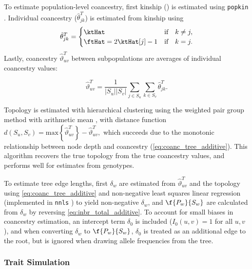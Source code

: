 \documentclass[11pt]{article}
\begin{document}
\begin{linenumbers}
To estimate population-level coancestry, first kinship (\ktHat) is estimated using \texttt{popkin} \citep{ochoa_estimating_2021}.
Individual coancestry ($\hat{\theta}_{jk}^T$) is estimated from kinship using
\begin{equation}
  \label{eq:kinship_to_coanc}
  \hat{\theta}_{jk}^T
  =
  \begin{cases}
    \ktHat & \text{if} \quad k \ne j, \\
    \ftHat = 2 \ktHat[j] - 1 & \text{if} \quad k = j.
  \end{cases}
\end{equation}
Lastly, coancestry $\hat{\vartheta}_{uv}^T$ between subpopulations are averages of individual coancestry values:
\begin{linenomath*}
$$
\hat{\vartheta}_{uv}^T
=
\frac{1}{|S_u||S_v|} \sum_{j \in S_u} \sum_{k \in S_v} \hat{\theta}_{jk}^T
.
$$
\end{linenomath*}

Topology is estimated with hierarchical clustering using the weighted pair group method with arithmetic mean \citep{sokal_statistical_1958}, with distance function
$
d( S_u, S_v ) = \text{max} \left\{ \hat{\vartheta}_{uv}^T \right\} - \hat{\vartheta}_{uv}^T,
$
which succeeds due to the monotonic relationship between node depth and coancestry (\cref{eq:coanc_tree_additive}).
This algorithm recovers the true topology from the true coancestry values, and performs well for estimates from genotypes.

To estimate tree edge lengths, first $\delta_w$ are estimated from $\hat{\vartheta}_{uv}^T$ and the topology using \cref{eq:coanc_tree_additive} and non-negative least squares linear regression \citep{lawson_solving_1974} (implemented in \texttt{nnls} \citep{mullen_nnls_2012}) to yield non-negative $\delta_w$, and $\f{P_w}{S_w}$ are calculated from $\delta_w$ by reversing \cref{eq:inbr_total_additive}.
To account for small biases in coancestry estimation, an intercept term $\delta_0$ is included ($I_0(u,v) = 1$ for all $u,v$), and when converting $\delta_w$ to $\f{P_w}{S_w}$, $\delta_0$ is treated as an additional edge to the root, but is ignored when drawing allele frequencies from the tree.

\subsubsection{Trait Simulation}


\end{linenumbers}
\end{document}
